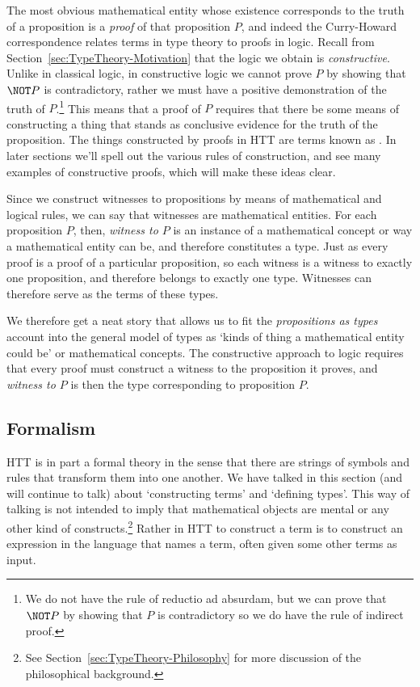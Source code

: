 The most obvious mathematical entity whose existence corresponds to the truth of a proposition is a \emph{proof} of that proposition $P$, and indeed the Curry-Howard correspondence relates terms in type theory to proofs in logic. 
Recall from Section~\ref{sec:TypeTheory-Motivation} that the logic we obtain is \emph{constructive}. Unlike in classical logic, in constructive logic we cannot prove $P$ by showing that $\NOT P$ is contradictory, rather we must have a positive demonstration of the truth of $P$.\footnote {We do not have the rule of reductio ad absurdam, but we can prove that $\NOT P$ by showing that $P$ is contradictory so we do have the rule of indirect proof.} 
This means that a proof of $P$ requires that there be some means of constructing a thing that stands as conclusive evidence for the truth of the proposition. The things constructed by proofs in HTT are terms known as . 
In later sections we'll spell out the various rules of construction, and see many examples of constructive proofs, which will make these ideas clear.

Since we construct witnesses to propositions by means of mathematical and logical rules, 
we can say that witnesses are mathematical entities. For each proposition $P$, then, \emph{witness to $P$} is an instance of a mathematical concept or way a mathematical entity can be, and therefore constitutes a type. Just as every proof is a proof of a particular proposition, so each witness is a witness to exactly one proposition, and therefore belongs to exactly one type. Witnesses can therefore serve as the terms of these types.

We therefore get a neat  story that allows us 
to fit the \emph{propositions as types} account into the general model of types as `kinds of thing a mathematical entity could be' or mathematical concepts. The constructive approach to logic requires that 
every proof must construct a witness to the proposition it proves, and \emph{witness to $P$} is then the type corresponding to proposition $P$.



\subsection{Formalism}
\label{sec:TypeTheory-Formalism}

HTT is in part a formal theory in the sense that there are strings of symbols and rules that transform them into one another. We have talked in this section (and will continue to talk) about `constructing terms' and `defining types'.  This way of talking is not intended to imply that mathematical objects are mental or any other kind of constructs.\footnote{
See Section~\ref{sec:TypeTheory-Philosophy} for more discussion of the philosophical background.
}
Rather in HTT to construct a term is to construct an expression in the language that names a term, often given some other terms as input. 

